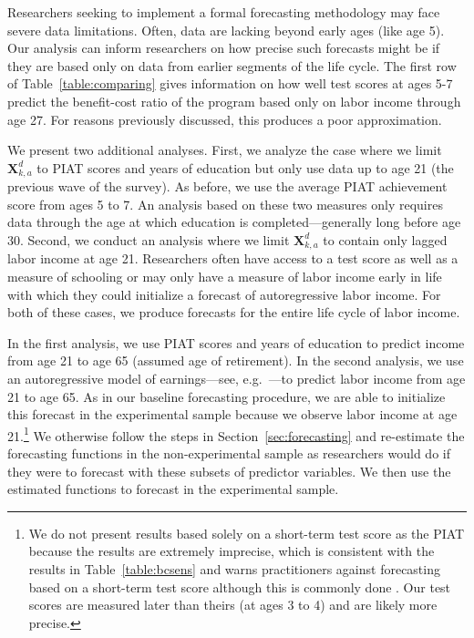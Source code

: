 Researchers seeking to implement a formal forecasting methodology may face severe data limitations. Often, data are lacking beyond early ages (like age 5). Our analysis can inform researchers on how precise such forecasts might be if they are based only on data from earlier segments of the life cycle. The first row of Table~\ref{table:comparing} gives information on how well test scores at ages 5-7 predict the benefit-cost ratio of the program based only on labor income through age 27. For reasons previously discussed, this produces a poor approximation.

We present two additional analyses. First, we analyze the case where we limit $\bm{X}_{k,a}^d$ to PIAT scores and years of education but only use data up to age 21 (the previous wave of the survey). As before, we use the average PIAT achievement score from ages 5 to 7. An analysis based on these two measures only requires data through the age at which education is completed---generally long before age 30. Second, we conduct an analysis where we limit $\bm{X}_{k,a}^d$ to contain only lagged labor income at age 21. Researchers often have access to a test score as well as a measure of schooling or may only have a measure of labor income early in life with which they could initialize a forecast of autoregressive labor income. For both of these cases, we produce forecasts for the entire life cycle of labor income.

In the first analysis, we use PIAT scores and years of education to predict income from age 21 to age 65 (assumed age of retirement). In the second analysis, we use an autoregressive model of earnings---see, e.g.\ \citet{Meghir_Pistaferri_2011_HLE}---to predict labor income from age 21 to age 65. As in our baseline forecasting procedure, we are able to initialize this forecast in the experimental sample because we observe labor income at age 21.\footnote{We do not present results based solely on a short-term test score as the PIAT because the results are extremely imprecise, which is consistent with the results in Table~\ref{table:bcsens} and warns practitioners against forecasting based on a short-term test score although this is commonly done \citep[e.g.][]{Kline_Walters_2016_QJE}. Our test scores are measured later than theirs (at ages 3 to 4) and are likely more precise.} We otherwise follow the steps in Section~\ref{sec:forecasting} and re-estimate the forecasting functions in the non-experimental sample as researchers would do if they were to forecast with these subsets of predictor variables. We then use the estimated functions to forecast in the experimental sample.

